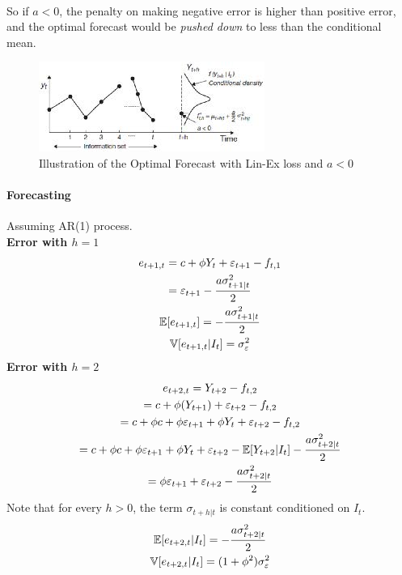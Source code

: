 \documentclass[11pt]{article}
\begin{document}
\begin{example}
\begin{gather}
				\end{gather} 
				So if $a < 0$, the penalty on making negative error is higher than positive error, and the optimal forecast would be \emph{pushed down} to less than the conditional mean.
				\begin{figure}[H]
					\centering
					\includegraphics{figures/asym_loss_forecast}
					\caption{Illustration of the Optimal Forecast with Lin-Ex loss and $a < 0$}
				\end{figure}
				\paragraph{Forecasting} Assuming AR(1) process. \\
				\textbf{Error with $h=1$}
					\begin{gather}
						e_{t+1, t} = c + \phi Y_t + \varepsilon_{t+1} - f_{t,1} \\
						= \varepsilon_{t+1} -\frac{a \sigma_{t+1|t}^2}{2} \\
						\mathbb{E}[{e_{t+1, t}}] = - \frac{a \sigma_{t+1|t}^2}{2} \\
						\mathbb{V}[{e_{t+1,t}|I_t}] = \sigma_\varepsilon^2
					\end{gather}
				\textbf{Error with $h=2$}
					\begin{gather}
						e_{t+2, t} = Y_{t+2} - f_{t, 2} \\
						= c + \phi(Y_{t+1}) + \varepsilon_{t+2} - f_{t,2} \\
						= c + \phi c + \phi \varepsilon_{t+1} + \phi Y_t + \varepsilon_{t+2} - f_{t,2} \\
						= c + \phi c + \phi \varepsilon_{t+1} + \phi Y_t + \varepsilon_{t+2} - \mathbb{E}[{Y_{t+2}|I_t}] - \frac{a \sigma_{t+2|t}^2}{2} \\
						= \phi \varepsilon_{t+1} + \varepsilon_{t+2} -  \frac{a \sigma_{t+2|t}^2}{2}
					\end{gather}
					Note that for every $h > 0$, the term $\sigma_{t+h|t}$ is constant conditioned on $I_t$.
					\begin{gather}
						\mathbb{E}[{e_{t+2,t}|I_t}] = - \frac{a \sigma_{t+2|t}^2}{2} \\
						\mathbb{V}[{e_{t+2,t}|I_t}] = (1 + \phi^2) \sigma_\varepsilon^2
					\end{gather}
			\end{example}
	
\end{document}
